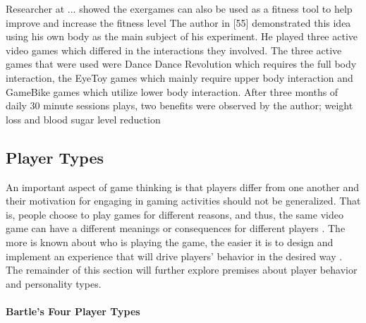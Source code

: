 Researcher at ... showed the exergames can also be used as a fitness tool to help improve and increase the fitness level
The author in [55]
demonstrated this idea using his own body as the main subject
of his experiment. He played three active video games which
differed in the interactions they involved. The three active
games that were used were Dance Dance Revolution which
requires the full body interaction, the EyeToy games which
mainly require upper body interaction and GameBike games
which utilize lower body interaction. After three months of
daily 30 minute sessions plays, two benefits were observed by
the author; weight loss and blood sugar level reduction
\subsection{Player Types}
An important aspect of game thinking is that players differ from one another and their motivation for engaging in gaming activities should not be generalized. That is, people choose to play games for different reasons, and thus, the same video game can have a different meanings or consequences for different players \cite{yee2006motivations}. The more is known about who is playing the game, the easier it is to design and implement an experience that will drive players' behavior in the desired way \cite{zichermann2011gamification}. The  remainder  of  this section will further explore premises about player behavior and personality types. 

\paragraph{Bartle's Four Player Types}

